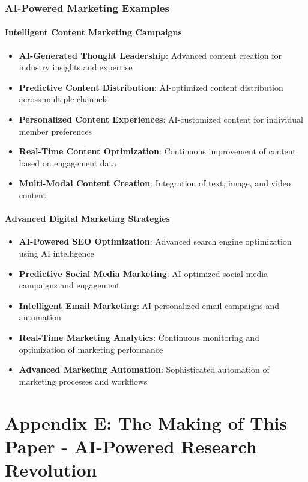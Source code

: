 \documentclass[12pt,a4paper]{book}
\begin{document}
\subsection{AI-Powered Marketing Examples}

\subsubsection{Intelligent Content Marketing Campaigns}

\begin{itemize}
    \item \textbf{AI-Generated Thought Leadership}: Advanced content creation for industry insights and expertise
    \item \textbf{Predictive Content Distribution}: AI-optimized content distribution across multiple channels
    \item \textbf{Personalized Content Experiences}: AI-customized content for individual member preferences
    \item \textbf{Real-Time Content Optimization}: Continuous improvement of content based on engagement data
    \item \textbf{Multi-Modal Content Creation}: Integration of text, image, and video content
\end{itemize}

\subsubsection{Advanced Digital Marketing Strategies}

\begin{itemize}
    \item \textbf{AI-Powered SEO Optimization}: Advanced search engine optimization using AI intelligence
    \item \textbf{Predictive Social Media Marketing}: AI-optimized social media campaigns and engagement
    \item \textbf{Intelligent Email Marketing}: AI-personalized email campaigns and automation
    \item \textbf{Real-Time Marketing Analytics}: Continuous monitoring and optimization of marketing performance
    \item \textbf{Advanced Marketing Automation}: Sophisticated automation of marketing processes and workflows
\end{itemize}

\chapter{Appendix E: The Making of This Paper - AI-Powered Research Revolution}
\end{document}
